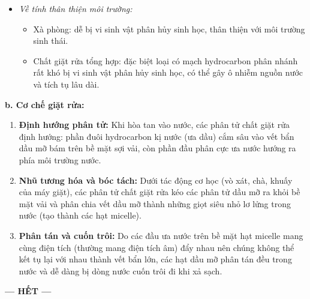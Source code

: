\documentclass[12pt,a4paper]{article}
\begin{document}
\begin{ex}
{\begin{itemize}
\begin{itemize}
\begin{itemize}
			\item Xà phòng: tạo kết tủa với các ion $\ce{Ca^{2+}}, \ce{Mg^{2+}}$ trong nước cứng (tạo $\ce{(RCOO)2Ca}, \ce{(RCOO)2Mg}$ kết tủa), làm giảm bọt, mất tác dụng giặt rửa và bám bẩn làm ố vàng vải sợi.
			\item Chất giặt rửa tổng hợp: các muối của ion $\ce{Ca^{2+}}, \ce{Mg^{2+}}$ vẫn tan tốt trong nước, do đó vẫn duy trì tác dụng giặt rửa tốt trong nước cứng.
		\end{itemize}
		\item \textit{Về tính thân thiện môi trường:}
		\begin{itemize}
			\item Xà phòng: dễ bị vi sinh vật phân hủy sinh học, thân thiện với môi trường sinh thái.
			\item Chất giặt rửa tổng hợp: đặc biệt loại có mạch hydrocarbon phân nhánh rất khó bị vi sinh vật phân hủy sinh học, có thể gây ô nhiễm nguồn nước và tích tụ lâu dài.
		\end{itemize}
	\end{itemize}
\end{itemize}

\textbf{b. Cơ chế giặt rửa:}
\begin{enumerate}[1.]
	\item \textbf{Định hướng phân tử:} Khi hòa tan vào nước, các phân tử chất giặt rửa định hướng: phần đuôi hydrocarbon kị nước (ưa dầu) cắm sâu vào vết bẩn dầu mỡ bám trên bề mặt sợi vải, còn phần đầu phân cực ưa nước hướng ra phía môi trường nước.
	\item \textbf{Nhũ tương hóa và bóc tách:} Dưới tác động cơ học (vò xát, chà, khuấy của máy giặt), các phân tử chất giặt rửa kéo các phân tử dầu mỡ ra khỏi bề mặt vải và phân chia vết dầu mỡ thành những giọt siêu nhỏ lơ lửng trong nước (tạo thành các hạt micelle).
	\item \textbf{Phân tán và cuốn trôi:} Do các đầu ưa nước trên bề mặt hạt micelle mang cùng điện tích (thường mang điện tích âm) đẩy nhau nên chúng không thể kết tụ lại với nhau thành vết bẩn lớn, các hạt dầu mỡ phân tán đều trong nước và dễ dàng bị dòng nước cuốn trôi đi khi xả sạch.
\end{enumerate}
}
\end{ex}

\begin{center}
\textbf{--- HẾT ---}
\end{center}
\end{document}
